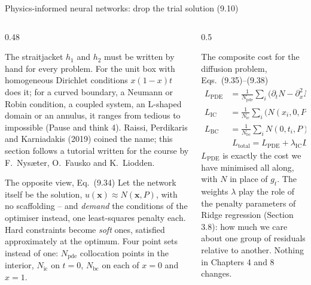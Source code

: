 \documentclass[10pt,aspectratio=169]{beamer}
\begin{document}

\begin{frame}{Physics-informed neural networks: drop the trial solution (9.10)}
\small
\begin{columns}[T]
\begin{column}{0.48\textwidth}
\begin{block}{The straitjacket}
\scriptsize
$h_1$ and $h_2$ must be written by hand for every problem.  For the unit box
with homogeneous Dirichlet conditions $x(1-x)t$ does it; for a curved
boundary, a Neumann or Robin condition, a coupled system, an L-shaped domain
or an annulus, it ranges from tedious to impossible (Pause and think 4).
Raissi, Perdikaris and Karniadakis (2019) coined the name; this section
follows a tutorial written for the course by F.\ Nys{\ae}ter, O.\ Fausko
and K.\ Liodden.
\end{block}
\begin{block}{The opposite view, Eq.~(9.34)}
\scriptsize
Let the network itself be the solution, $u(\bm{x})\approx N(\bm{x},P)$, with
no scaffolding -- and \emph{demand} the conditions of the optimiser instead,
one least-squares penalty each.  Hard constraints become \emph{soft} ones,
satisfied approximately at the optimum.  Four point sets instead of one:
$N_{\mathrm{pde}}$ collocation points in the interior, $N_{\mathrm{ic}}$ on
$t=0$, $N_{\mathrm{bc}}$ on each of $x=0$ and $x=1$.
\end{block}
\end{column}
\begin{column}{0.5\textwidth}
\begin{block}{The composite cost for the diffusion problem, Eqs.~(9.35)--(9.38)}
\scriptsize
\begin{align*}
  L_{\mathrm{PDE}}&=\tfrac{1}{N_{\mathrm{pde}}}\textstyle\sum_i\bigl(\partial_tN-\partial_x^{2}N\bigr)^{2}_{(x_i,t_i)},\\
  L_{\mathrm{IC}}&=\tfrac{1}{N_{\mathrm{ic}}}\textstyle\sum_i\bigl(N(x_i,0,P)-u(x_i)\bigr)^{2},\\
  L_{\mathrm{BC}}&=\tfrac{1}{N_{\mathrm{bc}}}\textstyle\sum_iN(0,t_i,P)^{2}
  +\tfrac{1}{N_{\mathrm{bc}}}\sum_iN(1,t_i,P)^{2},\\
  &\boxed{\;L_{\mathrm{total}}=L_{\mathrm{PDE}}+\lambda_{\mathrm{IC}}L_{\mathrm{IC}}+\lambda_{\mathrm{BC}}L_{\mathrm{BC}}\;}
\end{align*}
$L_{\mathrm{PDE}}$ is exactly the cost we have minimised all along, with $N$
in place of $g_t$.  The weights $\lambda$ play the role of the penalty
parameters of Ridge regression (Section 3.8): how much we care about one
group of residuals relative to another.  Nothing in Chapters 4 and 8 changes.
\end{block}
\end{column}
\end{columns}
\end{frame}
\end{document}
